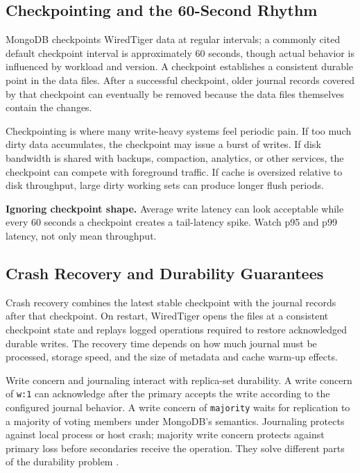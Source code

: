 \subsection{Checkpointing and the 60-Second Rhythm}
MongoDB checkpoints WiredTiger data at regular intervals; a commonly cited default checkpoint interval is approximately 60 seconds, though actual behavior is influenced by workload and version. A checkpoint establishes a consistent durable point in the data files. After a successful checkpoint, older journal records covered by that checkpoint can eventually be removed because the data files themselves contain the changes.

Checkpointing is where many write-heavy systems feel periodic pain. If too much dirty data accumulates, the checkpoint may issue a burst of writes. If disk bandwidth is shared with backups, compaction, analytics, or other services, the checkpoint can compete with foreground traffic. If cache is oversized relative to disk throughput, large dirty working sets can produce longer flush periods.

\begin{pitfall}
\textbf{Ignoring checkpoint shape.} Average write latency can look acceptable while every 60 seconds a checkpoint creates a tail-latency spike. Watch p95 and p99 latency, not only mean throughput.
\end{pitfall}

\subsection{Crash Recovery and Durability Guarantees}
Crash recovery combines the latest stable checkpoint with the journal records after that checkpoint. On restart, WiredTiger opens the files at a consistent checkpoint state and replays logged operations required to restore acknowledged durable writes. The recovery time depends on how much journal must be processed, storage speed, and the size of metadata and cache warm-up effects.

Write concern and journaling interact with replica-set durability. A write concern of \texttt{w:1} can acknowledge after the primary accepts the write according to the configured journal behavior. A write concern of \texttt{majority} waits for replication to a majority of voting members under MongoDB's semantics. Journaling protects against local process or host crash; majority write concern protects against primary loss before secondaries receive the operation. They solve different parts of the durability problem \cite{mongodbWriteConcernDocs,mongodbReplicationDocs}.

